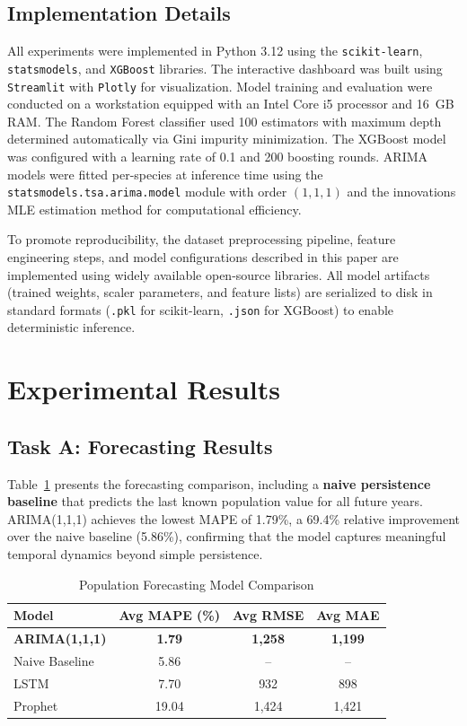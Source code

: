 \documentclass[conference]{IEEEtran}
\begin{document}
\subsection{Implementation Details}
All experiments were implemented in Python 3.12 using the \texttt{scikit-learn}, \texttt{statsmodels}, and \texttt{XGBoost} libraries. The interactive dashboard was built using \texttt{Streamlit} with \texttt{Plotly} for visualization. Model training and evaluation were conducted on a workstation equipped with an Intel Core i5 processor and 16~GB RAM. The Random Forest classifier used 100 estimators with maximum depth determined automatically via Gini impurity minimization. The XGBoost model was configured with a learning rate of 0.1 and 200 boosting rounds. ARIMA models were fitted per-species at inference time using the \texttt{statsmodels.tsa.arima.model} module with order $(1,1,1)$ and the innovations MLE estimation method for computational efficiency.

To promote reproducibility, the dataset preprocessing pipeline, feature engineering steps, and model configurations described in this paper are implemented using widely available open-source libraries. All model artifacts (trained weights, scaler parameters, and feature lists) are serialized to disk in standard formats (\texttt{.pkl} for scikit-learn, \texttt{.json} for XGBoost) to enable deterministic inference.

\section{Experimental Results}

\subsection{Task A: Forecasting Results}

Table~\ref{tab:forecast} presents the forecasting comparison, including a \textbf{naive persistence baseline} that predicts the last known population value for all future years. ARIMA(1,1,1) achieves the lowest MAPE of 1.79\%, a 69.4\% relative improvement over the naive baseline (5.86\%), confirming that the model captures meaningful temporal dynamics beyond simple persistence.

\begin{table}[h]
\caption{Population Forecasting Model Comparison}
\label{tab:forecast}
\centering
\begin{tabular}{lccc}
\toprule
\textbf{Model} & \textbf{Avg MAPE (\%)} & \textbf{Avg RMSE} & \textbf{Avg MAE} \\
\midrule
\textbf{ARIMA(1,1,1)} & \textbf{1.79} & \textbf{1,258} & \textbf{1,199} \\
Naive Baseline & 5.86 & -- & -- \\
LSTM & 7.70 & 932 & 898 \\
Prophet & 19.04 & 1,424 & 1,421 \\
\bottomrule
\end{tabular}
\end{table}
\end{document}
